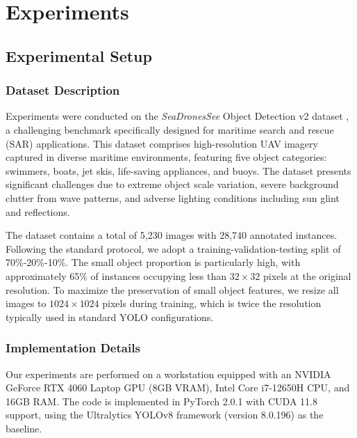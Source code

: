 
\section{Experiments}
\label{sec:experiments}

\subsection{Experimental Setup}

\subsubsection{Dataset Description}
Experiments were conducted on the \textit{SeaDronesSee} Object Detection v2 dataset \cite{b2}, a challenging benchmark specifically designed for maritime search and rescue (SAR) applications. This dataset comprises high-resolution UAV imagery captured in diverse maritime environments, featuring five object categories: swimmers, boats, jet skis, life-saving appliances, and buoys. The dataset presents significant challenges due to extreme object scale variation, severe background clutter from wave patterns, and adverse lighting conditions including sun glint and reflections.

The dataset contains a total of 5,230 images with 28,740 annotated instances. Following the standard protocol, we adopt a training-validation-testing split of 70\%-20\%-10\%. The small object proportion is particularly high, with approximately 65\% of instances occupying less than $32 \times 32$ pixels at the original resolution. To maximize the preservation of small object features, we resize all images to $1024 \times 1024$ pixels during training, which is twice the resolution typically used in standard YOLO configurations.

\subsubsection{Implementation Details}
Our experiments are performed on a workstation equipped with an NVIDIA GeForce RTX 4060 Laptop GPU (8GB VRAM), Intel Core i7-12650H CPU, and 16GB RAM. The code is implemented in PyTorch 2.0.1 with CUDA 11.8 support, using the Ultralytics YOLOv8 framework (version 8.0.196) as the baseline.

